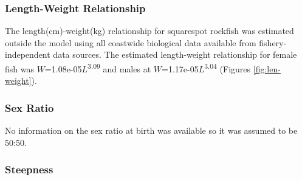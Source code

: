 \documentclass[11pt,
  english,
  a4paper,
]{article}
\begin{document}
\leavevmode\tagmcend\tagstructend\par


\hypertarget{length-weight-relationship}{%
\subsubsection{Length-Weight Relationship}\label{length-weight-relationship}}

\leavevmode\tagmcend\tagstructend


The length(cm)-weight(kg) relationship for squarespot rockfish was estimated outside the model using all coastwide biological data available from fishery-independent data sources. The estimated length-weight relationship for female fish was {\(W\)\leavevmode\tagmcend\tagstructend}=1.08e-05{\(L\)\leavevmode\tagmcend\tagstructend}\textsuperscript{3.09} and males at {\(W\)\leavevmode\tagmcend\tagstructend}=1.17e-05{\(L\)\leavevmode\tagmcend\tagstructend}\textsuperscript{3.04} (Figures \ref{fig:len-weight}).

\leavevmode\tagmcend\tagstructend\par


\hypertarget{sex-ratio}{%
\subsubsection{Sex Ratio}\label{sex-ratio}}

\leavevmode\tagmcend\tagstructend


No information on the sex ratio at birth was available so it was assumed to be 50:50.

\leavevmode\tagmcend\tagstructend\par


\hypertarget{steepness}{%
\subsubsection{Steepness}\label{steepness}}
\end{document}
